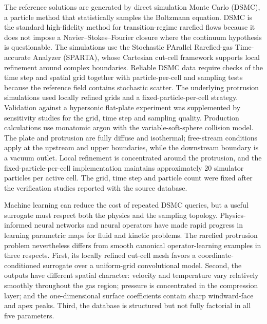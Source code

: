 \documentclass[aip,pof,preprint,notitlepage,floatfix,amsmath,amssymb]{revtex4-2}
\begin{document}
The reference solutions are generated by direct simulation Monte Carlo (DSMC), a particle method that statistically samples the Boltzmann equation. DSMC is the standard high-fidelity method for transition-regime rarefied flows because it does not impose a Navier--Stokes--Fourier closure where the continuum hypothesis is questionable.\cite{Boyd2017,Stefanov2019} The simulations use the Stochastic PArallel Rarefied-gas Time-accurate Analyzer (SPARTA), whose Cartesian cut-cell framework supports local refinement around complex boundaries.\cite{Plimpton2019} Reliable DSMC data require checks of the time step and spatial grid together with particle-per-cell and sampling tests because the reference field contains stochastic scatter. The underlying protrusion simulations used locally refined grids and a fixed-particle-per-cell strategy. Validation against a hypersonic flat-plate experiment was supplemented by sensitivity studies for the grid, time step and sampling quality.\cite{Becker1974,Sun2011PPC,Shamseddine2019,Sabouri2024FPPC} Production calculations use monatomic argon with the variable-soft-sphere collision model. The plate and protrusion are fully diffuse and isothermal; free-stream conditions apply at the upstream and upper boundaries, while the downstream boundary is a vacuum outlet. Local refinement is concentrated around the protrusion, and the fixed-particle-per-cell implementation maintains approximately 20 simulator particles per active cell. The grid, time step and particle count were fixed after the verification studies reported with the source database.\cite{SabouriLekzian2026}

Machine learning can reduce the cost of repeated DSMC queries, but a useful surrogate must respect both the physics and the sampling topology. Physics-informed neural networks and neural operators have made rapid progress in learning parametric maps for fluid and kinetic problems.\cite{Raissi2019,Karniadakis2021,Lu2021,Maulik2020,Morimoto2022,Peyvan2026,RoohiMahdavi2026} The rarefied protrusion problem nevertheless differs from smooth canonical operator-learning examples in three respects. First, its locally refined cut-cell mesh favors a coordinate-conditioned surrogate over a uniform-grid convolutional model. Second, the outputs have different spatial character: velocity and temperature vary relatively smoothly throughout the gas region; pressure is concentrated in the compression layer; and the one-dimensional surface coefficients contain sharp windward-face and apex peaks. Third, the database is structured but not fully factorial in all five parameters.
\end{document}
